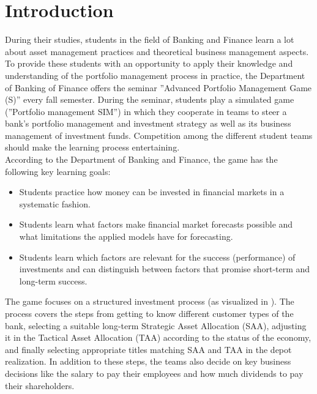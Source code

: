 \section{Introduction}
\label{sec:introduction}

During their studies, students in the field of Banking and Finance learn a lot about asset management practices and theoretical business management aspects. To provide these students with an opportunity to apply their knowledge and understanding of the portfolio management process in practice, the Department of Banking of Finance offers the seminar ''Advanced Portfolio Management Game (S)'' every fall semester. During the seminar, students play a simulated game (''Portfolio management SIM'') in which they cooperate in teams to steer a bank's portfolio management and investment strategy as well as its business management of investment funds. Competition among the different student teams should make the learning process entertaining. \\

According to the Department of Banking and Finance, the game has the following key learning goals:
\begin{itemize}
  \item Students practice how money can be invested in financial markets in a systematic fashion.
  \item Students learn what factors make financial market forecasts possible and what limitations the applied models have for forecasting.
  \item Students learn which factors are relevant for the success (performance) of investments and can distinguish between factors that promise short-term and long-term success.
\end{itemize}

The game focuses on a structured investment process (as visualized in ). The process covers the steps from getting to know different customer types of the bank, selecting a suitable long-term Strategic Asset Allocation (SAA), adjusting it in the Tactical Asset Allocation (TAA) according to the status of the economy, and finally selecting appropriate titles matching SAA and TAA in the depot realization. In addition to these steps, the teams also decide on key business decisions like the salary to pay their employees and how much dividends to pay their shareholders.

